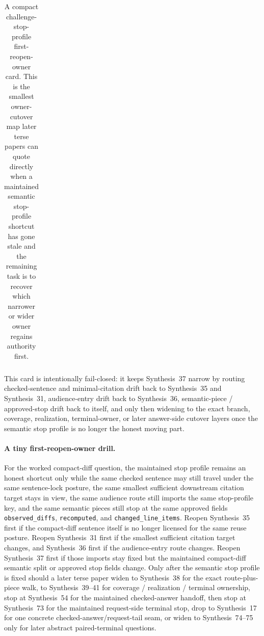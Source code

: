 \documentclass[11pt]{article}
\begin{document}
\begin{table}[t]
\begin{tabularx}{\linewidth}{@{}lX@{}}
\bottomrule
\end{tabularx}
\caption{A compact challenge-stop-profile first-reopen-owner card. This is the smallest owner-cutover map later terse papers can quote directly when a maintained semantic stop-profile shortcut has gone stale and the remaining task is to recover which narrower or wider owner regains authority first.}
\label{tab:challenge-stop-profile-first-reopen-owner-card}
\end{table}

This card is intentionally fail-closed: it keeps Synthesis~37 narrow by routing checked-sentence and minimal-citation drift back to Synthesis~35 and Synthesis~31, audience-entry drift back to Synthesis~36, semantic-piece / approved-stop drift back to itself, and only then widening to the exact branch, coverage, realization, terminal-owner, or later answer-side cutover layers once the semantic stop profile is no longer the honest moving part.

\paragraph{A tiny first-reopen-owner drill.}
For the worked compact-diff question, the maintained stop profile remains an honest shortcut only while the same checked sentence may still travel under the same sentence-lock posture, the same smallest sufficient downstream citation target stays in view, the same audience route still imports the same stop-profile key, and the same semantic pieces still stop at the same approved fields \nolinkurl{observed_diffs}, \nolinkurl{recomputed}, and \nolinkurl{changed_line_items}. Reopen Synthesis~35 first if the compact-diff sentence itself is no longer licensed for the same reuse posture. Reopen Synthesis~31 first if the smallest sufficient citation target changes, and Synthesis~36 first if the audience-entry route changes. Reopen Synthesis~37 first if those imports stay fixed but the maintained compact-diff semantic split or approved stop fields change. Only after the semantic stop profile is fixed should a later terse paper widen to Synthesis~38 for the exact route-plus-piece walk, to Synthesis~39--41 for coverage / realization / terminal ownership, stop at Synthesis~54 for the maintained checked-answer handoff, then stop at Synthesis~73 for the maintained request-side terminal stop, drop to Synthesis~17 for one concrete checked-answer/request-tail seam, or widen to Synthesis~74--75 only for later abstract paired-terminal questions.\cite{series:workedexample,series:sentencelocks,series:downstreamnormalforms,series:challengeroutes,series:challengebranches,series:challengecoverage,series:challengesurfacehooks,series:challengeterminalwitnesses,series:challengeanswerreviewmenus,series:publicrequestresponsepacketrefreshresponsepacketclosureverdicts,series:pairedterminalcitationdiscipline,series:pairedterminalcutoverrules,series:workedexample}
\end{document}
